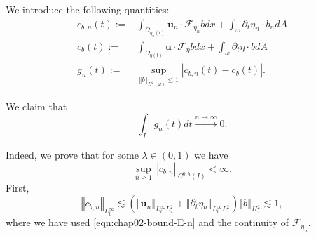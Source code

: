 \documentclass[10pt,a4paper]{article}
\numberwithin{equation}{section}
\begin{document}
We introduce the following quantities:
\begin{equation}
\begin{aligned}c_{b,n}\left(t\right):= & \int_{\Omega_{\eta_{n}\left(t\right)}}\mathbf{u}_{n}\cdot\mathcal{F}_{\eta_{n}}bdx+\int_{\omega}\partial_{t}\eta_{n}\cdot b_{n}dA\\
c_{b}\left(t\right):= & \int_{\Omega_{\eta\left(t\right)}}\mathbf{u}\cdot\mathcal{F}_{\eta}bdx+\int_{\omega}\partial_{t}\eta\cdot bdA\\
g_{n}\left(t\right):= & \sup_{\left\Vert b\right\Vert _{H^{2}\left(\omega\right)}\le1}\left|c_{b,n}\left(t\right)-c_{b}\left(t\right)\right|.
\end{aligned}
\end{equation}

We claim that
\begin{equation}\label{eqn:chap02-conv-gn-0}
\int_{I}g_{n}\left(t\right)dt\xrightarrow{n\to\infty}0.
\end{equation}

Indeed, we prove that for some $\lambda \in (0, 1)$ we have
\begin{equation}\label{eqn:chap02-claim-Arzela}
\sup_{n\ge1}\left\Vert c_{b,n}\right\Vert _{C^{0,\lambda}\left(I\right)}<\infty.
\end{equation}
First,
\begin{equation}
\left\Vert c_{b,n}\right\Vert _{L_{t}^{\infty}}\lesssim\left(\left\Vert \mathbf{u}_{n}\right\Vert _{L_{t}^{\infty}L_{x}^{2}}+\left\Vert \partial_{t}\eta{}_{n}\right\Vert _{L_{t}^{\infty}L_{x}^{2}}\right)\left\Vert b\right\Vert _{H_{x}^{2}}\lesssim1,
\end{equation}
where we have used \eqref{eqn:chap02-bound-E-n}  and the continuity of $\mathcal{F}_{\eta_n}$.
\end{document}
